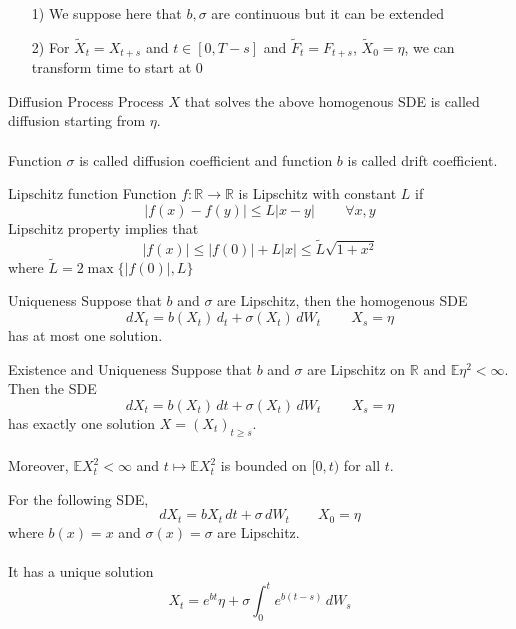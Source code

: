 \documentclass[12pt,a4paper]{article}
\newcommand{\R}{\mathbb{R}}
\newcommand{\E}{\mathbb{E}}
\begin{document}
    \begin{remark}{}{}
        \begin{enumerate}
            \item[1)] We suppose here that $b,\sigma$ are continuous but it can be extended
            \item[2)] For $\tilde X_t = X_{t+s}$ and $t\in[0,T-s]$ and $\tilde F_t = F_{t+s}$, $\tilde X_0=\eta$, we can transform time to start at $0$
        \end{enumerate}
    \end{remark}
    \begin{definition}{Diffusion Process}{}
        Process $X$ that solves the above homogenous SDE is called diffusion starting from $\eta$.\\
        \\
        Function $\sigma$ is called diffusion coefficient and function $b$ is called drift coefficient.
    \end{definition}
    \begin{definition}{Lipschitz function}{}
        Function $f:\R\to \R$ is Lipschitz with constant $L$ if
        $$
        |f(x)-f(y)|\le L|x-y|\, \qquad\forall x,y
        $$
        Lipschitz property implies that
        $$
        |f(x)|\le |f(0)| + L|x|\le \tilde L\sqrt{1+x^2}
        $$
        where $\tilde L = 2\max\{|f(0)|, L\}$
    \end{definition}
    \pagebreak
    \begin{theorem}{Uniqueness}{}
        Suppose that $b$ and $\sigma$ are Lipschitz, then the homogenous SDE 
        $$
        dX_t = b(X_t)\,d_t + \sigma(X_t)\, dW_t\,\qquad X_s=\eta
        $$
        has at most one solution. 
    \end{theorem}
    \begin{theorem}{Existence and Uniqueness}{}
        Suppose that $b$ and $\sigma$ are Lipschitz on $\R$ and $\E\eta^2<\infty$. Then the SDE
        $$
        dX_t = b(X_t)\, dt + \sigma(X_t)\, dW_t\,\qquad X_s=\eta
        $$
        has exactly one solution $X = (X_t)_{t\ge s}$.\\
        \\
        Moreover, $\E X_t^2 <\infty$ and $t\mapsto \E X_t^2$ is bounded on $[0,t)$ for all $t$.
    \end{theorem}
    \begin{example}{}{}
        For the following SDE,
        $$
        dX_t = bX_t\, dt + \sigma\, dW_t\qquad X_0 =\eta
        $$
        where $b(x) =x$ and $\sigma(x)=\sigma$ are Lipschitz.\\
        \\
        It has a unique solution
        $$
        X_t = e^{bt}\eta + \sigma\int_0^t e^{b(t-s)}\, dW_s
        $$
    \end{example}
\end{document}
